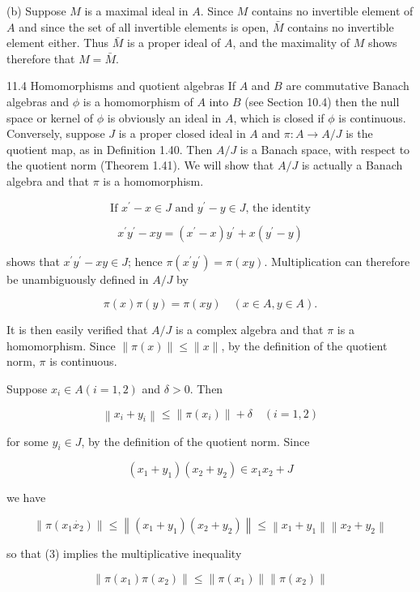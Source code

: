 \documentclass[10pt]{article}
\begin{document}
(b) Suppose $M$ is a maximal ideal in $A$. Since $M$ contains no invertible element of $A$ and since the set of all invertible elements is open, $\bar{M}$ contains no invertible element either. Thus $\bar{M}$ is a proper ideal of $A$, and the maximality of $M$ shows therefore that $M=\bar{M}$.

11.4 Homomorphisms and quotient algebras If $A$ and $B$ are commutative Banach algebras and $\phi$ is a homomorphism of $A$ into $B$ (see Section 10.4) then the null space or kernel of $\phi$ is obviously an ideal in $A$, which is closed if $\phi$ is continuous. Conversely, suppose $J$ is a proper closed ideal in $A$ and $\pi: A \rightarrow A / J$ is the quotient map, as in Definition 1.40. Then $A / J$ is a Banach space, with respect to the quotient norm (Theorem 1.41). We will show that $A / J$ is actually a Banach algebra and that $\pi$ is a homomorphism.

$$
\text { If } x^{\prime}-x \in J \text { and } y^{\prime}-y \in J \text {, the identity }
$$

$$
x^{\prime} y^{\prime}-x y=\left(x^{\prime}-x\right) y^{\prime}+x\left(y^{\prime}-y\right)
$$

shows that $x^{\prime} y^{\prime}-x y \in J$; hence $\pi\left(x^{\prime} y^{\prime}\right)=\pi(x y)$. Multiplication can therefore be unambiguously defined in $A / J$ by

$$
\pi(x) \pi(y)=\pi(x y) \quad(x \in A, y \in A) .
$$

It is then easily verified that $A / J$ is a complex algebra and that $\pi$ is a homomorphism. Since $\|\pi(x)\| \leq\|x\|$, by the definition of the quotient norm, $\pi$ is continuous.

Suppose $x_{i} \in A(i=1,2)$ and $\delta>0$. Then

$$
\left\|x_{i}+y_{i}\right\| \leq\left\|\pi\left(x_{i}\right)\right\|+\delta \quad(i=1,2)
$$

for some $y_{i} \in J$, by the definition of the quotient norm. Since

$$
\left(x_{1}+y_{1}\right)\left(x_{2}+y_{2}\right) \in x_{1} x_{2}+J
$$

we have

$$
\left\|\pi\left(x_{1} \dot{x_{2}}\right)\right\| \leq\left\|\left(x_{1}+y_{1}\right)\left(x_{2}+y_{2}\right)\right\| \leq\left\|x_{1}+y_{1}\right\|\left\|x_{2}+y_{2}\right\|
$$

so that (3) implies the multiplicative inequality

$$
\left\|\pi\left(x_{1}\right) \pi\left(x_{2}\right)\right\| \leq\left\|\pi\left(x_{1}\right)\right\|\left\|\pi\left(x_{2}\right)\right\|
$$
\end{document}

